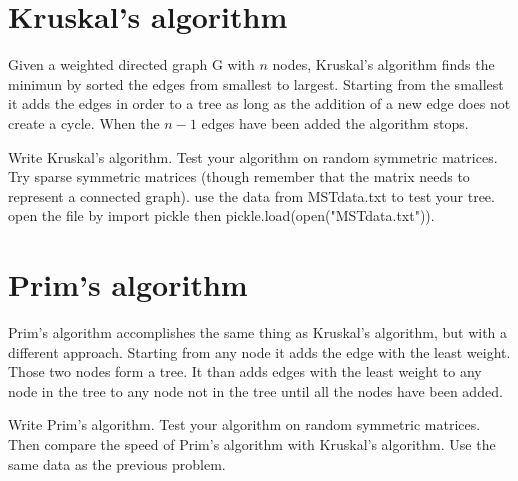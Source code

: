 \section*{Kruskal's algorithm}

Given a weighted directed graph G with $n$ nodes, Kruskal's algorithm finds the minimun by sorted the edges from smallest to largest. Starting from the smallest it adds the edges in order to a tree as long as the addition of a new edge does not create a cycle. When the $n-1$ edges have been added the algorithm stops. 

\begin{problem}
Write Kruskal's algorithm. Test your algorithm on random symmetric matrices. Try sparse symmetric matrices (though remember that the matrix needs to represent a connected graph). use the data from MSTdata.txt to test your tree. open the file by import pickle then pickle.load(open("MSTdata.txt")).
\end{problem}

\section*{Prim's algorithm}

Prim's algorithm accomplishes the same thing as Kruskal's algorithm, but with a different approach. Starting from any node it adds the edge with the least weight. Those two nodes form a tree. It than adds edges with the least weight to any node in the tree to any node not in the tree until all the nodes have been added. 

\begin{problem}
Write Prim's algorithm. Test your algorithm on random symmetric matrices. Then compare the speed of Prim's algorithm with Kruskal's algorithm. Use the same data as the previous problem. 
\end{problem}
